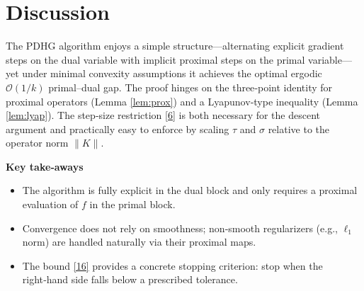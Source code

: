 \documentclass{article}
\begin{document}
\section*{Discussion}
The PDHG algorithm enjoys a simple structure—alternating explicit gradient steps on the dual variable with implicit proximal steps on the primal variable—yet under minimal convexity assumptions it achieves the optimal ergodic $\mathcal{O}(1/k)$ primal–dual gap. The proof hinges on the three‑point identity for proximal operators (Lemma \ref{lem:prox}) and a Lyapunov‑type inequality (Lemma \ref{lem:lyap}). The step‑size restriction \eqref{6} is both necessary for the descent argument and practically easy to enforce by scaling $\tau$ and $\sigma$ relative to the operator norm $\|K\|$.

\bigskip
\noindent\textbf{Key take‑aways}
\begin{itemize}
\item The algorithm is fully explicit in the dual block and only requires a proximal evaluation of $f$ in the primal block.
\item Convergence does not rely on smoothness; non‑smooth regularizers (e.g., $\ell_{1}$ norm) are handled naturally via their proximal maps.
\item The bound \eqref{16} provides a concrete stopping criterion: stop when the right‑hand side falls below a prescribed tolerance.
\end{itemize}
\end{document}
